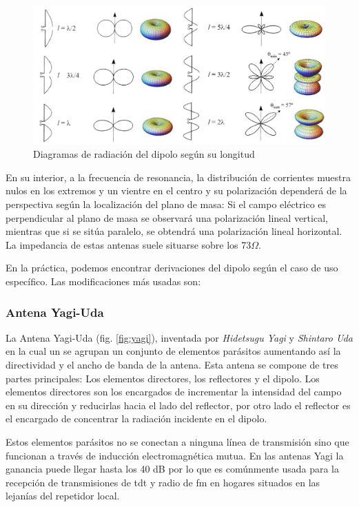 \begin{figure}[h]
    \centering
        \includegraphics[width=15cm]{archivos/dipolo/radiaciones}
        \caption{Diagramas de radiación del dipolo según su longitud}
        \label{fig:diagramadipolo}
\end{figure}

\par En su interior, a la frecuencia de resonancia, la distribución de corrientes muestra nulos en los extremos y un vientre en el centro y su polarización dependerá de la perspectiva según la localización del plano de masa: Si el campo eléctrico es perpendicular al plano de masa se observará una polarización lineal vertical, mientras que si se sitúa paralelo, se obtendrá una polarización lineal horizontal. La impedancia de estas antenas suele situarse sobre los 73$\Omega$.
\\
\par En la práctica, podemos encontrar derivaciones del dipolo según el caso de uso específico. Las modificaciones más usadas son:

\subsubsection{Antena Yagi-Uda}

La Antena Yagi-Uda (fig. \ref{fig:yagi}), inventada por \textit{Hidetsugu Yagi} y \textit{Shintaro Uda} en la cual un se agrupan un conjunto de elementos parásitos aumentando así la directividad y el ancho de banda de la antena. Esta antena se compone de tres partes principales: Los elementos directores, los reflectores y el dipolo. Los elementos directores son los encargados de incrementar la intensidad del campo en su dirección y reducirlas hacia el lado del reflector, por otro lado el reflector es el encargado de concentrar la radiación incidente en el dipolo. 
\\
\par Estos elementos parásitos no se conectan a  ninguna línea de transmisión sino que funcionan a través de inducción electromagnética mutua. En las antenas Yagi la ganancia puede llegar hasta los 40 dB por lo que es comúnmente usada para la recepción de transmisiones de \gls{tdt} y radio de \gls{fm} en hogares situados en las lejanías del repetidor local.



